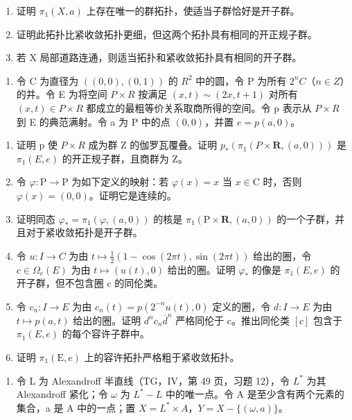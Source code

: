 \begin{enumerate}
\def\labelenumi{\alph{enumi})}
\item
  证明 \(\pi_{1}(X,a)\) 上存在唯一的群拓扑，使适当子群恰好是开子群。
\item
  证明此拓扑比紧收敛拓扑更细，但这两个拓扑具有相同的开正规子群。
\item
  若 X 局部道路连通，则适当拓扑和紧收敛拓扑具有相同的开子群。
\end{enumerate}

\begin{enumerate}
\def\labelenumi{\arabic{enumi})}
\setcounter{enumi}{2}
\tightlist
\item
  令 C 为直径为 \(((0,0),(0,1))\) 的 \(R^{2}\) 中的圆，令 P 为所有 \(2^{n}C\)（\(n \in Z\)）的并。令 E 为将空间 \(P \times R\) 按满足 \((x,t) \sim (2x,t+1)\) 对所有 \((x,t) \in P \times R\) 都成立的最粗等价关系取商所得的空间。令 p 表示从 \(P \times R\) 到 E 的典范满射。令 a 为 P 中的点 \((0,0)\)，并置 \(e = p(a,0)\)。
\end{enumerate}

\begin{enumerate}
\def\labelenumi{\alph{enumi})}
\item
  证明 p 使 \(P \times R\) 成为群 Z 的伽罗瓦覆叠。证明 \(p_{*}(\pi_{1}(P \times \mathbf{R}, (a,0)))\) 是 \(\pi_{1}(E, e)\) 的开正规子群，且商群为 Z。
\item
  令 \(\varphi\colon\mathrm{P}\to\mathrm{P}\) 为如下定义的映射：若 \(\varphi(x)=x\) 当 \(x\in\mathrm{C}\) 时，否则 \(\varphi(x)=(0,0)\)。证明它是连续的。
\item
  证明同态 \(\varphi_{*} = \pi_{1}(\varphi, (a,0))\) 的核是 \(\pi_{1}(\mathrm{P} \times \mathbf{R}, (a,0))\) 的一个子群，并且对于紧收敛拓扑是开子群。
\item
  令 \(u: I \to C\) 为由 \(t \mapsto \frac{1}{2}(1 - \cos(2\pi t), \sin(2\pi t))\) 给出的圈，令 \(c \in \Omega_e(E)\) 为由 \(t \mapsto (u(t), 0)\) 给出的圈。证明 \(\varphi_*\) 的像是 \(\pi_1(E, e)\) 的开子群，但不包含圈 c 的同伦类。
\item
  令 \(c_{n}: I \to E\) 为由 \(c_{n}(t) = p(2^{-n}u(t), 0)\) 定义的圈，令 \(d: I \to E\) 为由 \(t \mapsto p(a, t)\) 给出的圈。证明 \(d^{n}c_{n}\overline{d}^{n}\) 严格同伦于 c。推出同伦类 \([c]\) 包含于 \(\pi_{1}(E, e)\) 的每个容许子群中。
\item
  证明 \(\pi_{1}(\mathrm{E},e)\) 上的容许拓扑严格粗于紧收敛拓扑。
\end{enumerate}

\begin{enumerate}
\def\labelenumi{\arabic{enumi})}
\setcounter{enumi}{3}
\tightlist
\item
  令 L 为 Alexandroff 半直线（TG，IV，第 49 页，习题 12），令 \(L^{*}\) 为其 Alexandroff 紧化；令 \(\omega\) 为 \(L^{*} - L\) 中的唯一点。令 A 是至少含有两个元素的集合，a 是 A 中的一点；置 \(X = L^{*} \times A\)，\(Y = X - \{(\omega, a)\}\)。
\end{enumerate}

